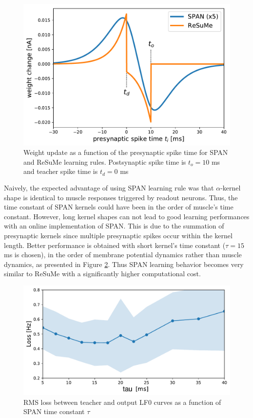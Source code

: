 \documentclass[11pt, a4paper]{article} %
\begin{document}
\begin{figure}
\centering
\includegraphics[scale=.7]{figures/weight_update.pdf}
\caption{Weight update as a function of the presynaptic spike time for SPAN and ReSuMe learning rules. Postsynaptic spike time is $t_o = 10$ ms and teacher spike time is $t_d = 0$ ms}
\label{dw}
\end{figure}

Naively, the expected advantage of using SPAN learning rule was that $\alpha$-kernel shape is identical to muscle responses triggered by readout neurons. Thus, the time constant of SPAN kernels could have been in the order of muscle's time constant. However, long kernel shapes can not lead to good learning performances with an online implementation of SPAN. This is due to the summation of presynaptic kernels since multiple presynaptic spikes occur within the kernel length. Better performance is obtained with short kernel's time constant ($\tau = 15$ ms is chosen), in the order of membrane potential dynamics rather than muscle dynamics, as presented in Figure \ref{SPANtheta}. Thus SPAN learning behavior becomes very similar to ReSuMe with a significantly higher computational cost.

\begin{figure}
\centering
\includegraphics[scale=.7]{figures/SPANtheta.pdf}
\caption{RMS loss between teacher and output LF0 curves as a function of SPAN time constant $\tau$}
\label{SPANtheta}
\end{figure}
\end{document}
